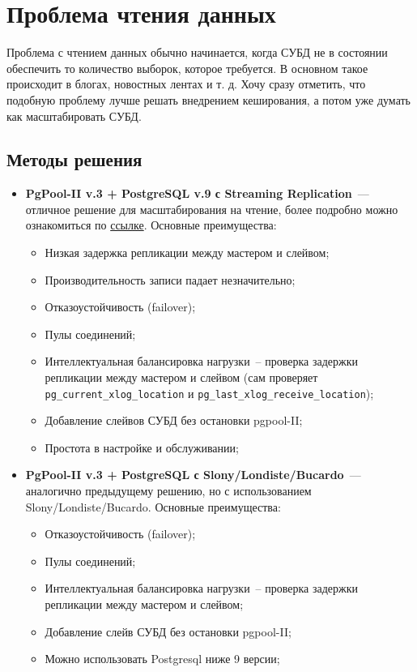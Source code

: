 \section{Проблема чтения данных}

Проблема с чтением данных обычно начинается, когда СУБД не в состоянии обеспечить то количество выборок, которое требуется. В основном такое происходит в блогах, новостных лентах и т. д. Хочу сразу отметить, что подобную проблему лучше решать внедрением кеширования, а потом уже думать как масштабировать СУБД.

\subsection{Методы решения}

\begin{itemize}
  \item \textbf{PgPool-II v.3 + PostgreSQL v.9 с Streaming Replication}~--- отличное решение для масштабирования на чтение, более подробно можно ознакомиться по \href{http://pgpool.projects.pgfoundry.org/contrib\_docs/simple\_sr\_setting/index.html}{ссылке}. Основные преимущества:

  \begin{itemize}
    \item Низкая задержка репликации между мастером и слейвом;
    \item Производительность записи падает незначительно;
    \item Отказоустойчивость (failover);
    \item Пулы соединений;
    \item Интеллектуальная балансировка нагрузки~-- проверка задержки репликации между мастером и слейвом (сам проверяет \lstinline!pg_current_xlog_location! и \lstinline!pg_last_xlog_receive_location!);
    \item Добавление слейвов СУБД без остановки pgpool-II;
    \item Простота в настройке и обслуживании;
  \end{itemize}

  \item \textbf{PgPool-II v.3 + PostgreSQL с Slony/Londiste/Bucardo}~--- аналогично предыдущему решению, но с использованием Slony/Londiste/Bucardo. Основные преимущества:

  \begin{itemize}
    \item Отказоустойчивость (failover);
    \item Пулы соединений;
    \item Интеллектуальная балансировка нагрузки~-- проверка задержки репликации между мастером и слейвом;
    \item Добавление слейв СУБД без остановки pgpool-II;
    \item Можно использовать Postgresql ниже 9 версии;
  \end{itemize}


\end{itemize}
